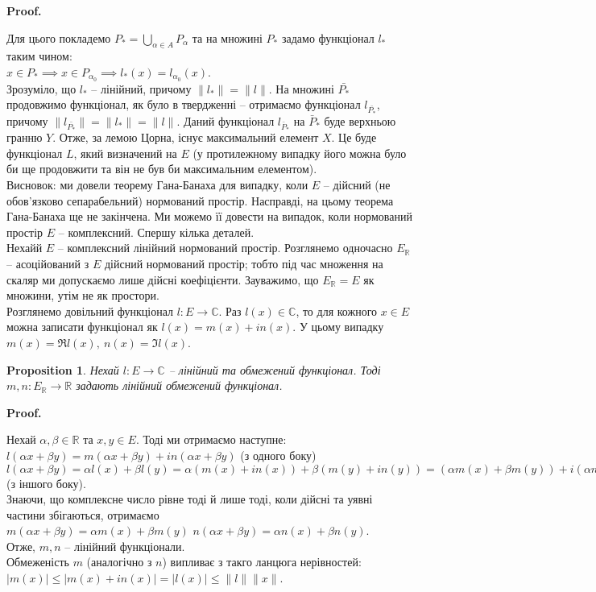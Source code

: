 \documentclass[a4paper, 10pt]{article}
\makeatletter
\theoremstyle{theoremdd}
\theoremstyle{theoremdd}
\theoremstyle{theoremdd}
\theoremstyle{theoremdd}
\theoremstyle{theoremdd}
\newtheorem{proposition}[theorem]{Proposition}
\theoremstyle{theoremdd}
\theoremstyle{theoremdd}
\theoremstyle{theoremdd}
\renewenvironment{proof}[1][Proof.\\]{\par
\pushQED{\hfill \qed}%
\normalfont \topsep6\p@\@plus6\p@\relax
\trivlist
\item\relax
{\bfseries
#1\@addpunct{.}}\hspace\labelsep\ignorespaces
}{%
\popQED\endtrivlist\@endpefalse
}
\makeatother
\begin{document}
\begin{proof}
Для цього покладемо $P_* = \displaystyle\bigcup_{\alpha \in A} P_\alpha$ та на множині $P_*$ задамо функціонал $l_*$ таким чином:\\
$x \in P_* \implies x \in P_{\alpha_0} \implies l_*(x) = l_{\alpha_0}(x)$.\\
Зрозуміло, що $l_*$ -- лінійний, причому $\|l_*\| = \|l\|$. На множині $\bar{P_*}$ продовжимо функціонал, як було в твердженні -- отримаємо функціонал $l_{\bar{P_*}}$, причому $\|l_{\bar{P_*}}\| = \|l_*\| = \|l\|$. Даний функціонал $l_{\bar{P}_*}$ на $\bar{P}_*$ буде верхньою гранню $Y$. Отже, за лемою Цорна, існує максимальний елемент $X$. Це буде функціонал $L$, який визначений на $E$ (у протилежному випадку його можна було би ще продовжити та він не був би максимальним елементом).\\
Висновок: ми довели теорему Гана-Банаха для випадку, коли $E$ -- дійсний (не обов'язково сепарабельний) нормований простір.
\end{proof}
\noindent
Насправді, на цьому теорема Гана-Банаха ще не закінчена. Ми можемо її довести на випадок, коли нормований простір $E$ -- комплексний. Спершу кілька деталей.\\
Нехайй $E$ -- комплексний лінійний нормований простір. Розглянемо одночасно $E_{\mathbb{R}}$ -- асоційований з $E$ дійсний нормований простір; тобто під час множення на скаляр ми допускаємо лише дійсні коефіцієнти. Зауважимо, що $E_{\mathbb{R}} = E$ як множини, утім не як простори.\\
Розглянемо довільний функціонал $l \colon E \to \mathbb{C}$. Раз $l(x) \in \mathbb{C}$, то для кожного $x \in E$ можна записати функціонал як $l(x) = m(x) + i n(x)$. У цьому випадку $m(x) = \Re l(x),\ n(x) = \Im l(x)$.

\begin{proposition}
Нехай $l \colon E \to \mathbb{C}$ -- лінійний та обмежений функціонал. Тоді $m,n \colon E_{\mathbb{R}} \to \mathbb{R}$ задають лінійний обмежений функціонал.
\end{proposition}

\begin{proof}
Нехай $\alpha,\beta \in \mathbb{R}$ та $x,y \in E$. Тоді ми отримаємо наступне:\\
$l(\alpha x + \beta y) = m(\alpha x + \beta y) + i n(\alpha x + \beta y)$ (з одного боку)\\
$l(\alpha x + \beta y) = \alpha l(x) + \beta l(y) = \alpha (m(x) + i n(x)) + \beta (m(y) + i n(y)) = (\alpha m(x) + \beta m(y)) + i(\alpha n(x) + \beta n(y))$ (з іншого боку).\\
Знаючи, що комплексне число рівне тоді й лише тоді, коли дійсні та уявні частини збігаються, отримаємо\\
$m(\alpha x + \beta y) = \alpha m(x) + \beta m(y)$ \qquad $n(\alpha x + \beta y) = \alpha n(x) + \beta n(y)$.\\
Отже, $m,n$ -- лінійний функціонали.\\
Обмеженість $m$ (аналогічно з $n$) випливає з такго ланцюга нерівностей:\\
$|m(x)| \leq |m(x) + in(x)| = |l(x)| \leq \|l\| \|x\|$.
\end{proof}
\end{document}
